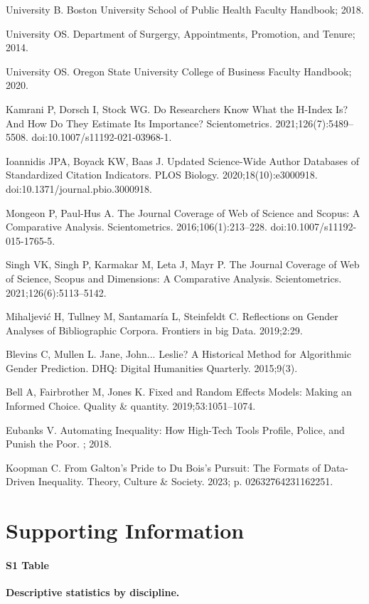 \documentclass[
  10pt,
  letterpaper,
]{article}
\begin{document}
\begin{thebibliography}{10}
University B.
\newblock Boston {{University School}} of {{Public Health Faculty Handbook}}; 2018.

University OS.
\newblock Department of {{Surgergy}}, {{Appointments}}, {{Promotion}}, and {{Tenure}}; 2014.

University OS.
\newblock Oregon {{State University College}} of {{Business Faculty Handbook}}; 2020.

Kamrani P, Dorsch I, Stock WG.
\newblock Do Researchers Know What the H-Index Is? {{And}} How Do They Estimate Its Importance?
\newblock Scientometrics. 2021;126(7):5489--5508.
\newblock doi:{10.1007/s11192-021-03968-1}.

Ioannidis JPA, Boyack KW, Baas J.
\newblock Updated Science-Wide Author Databases of Standardized Citation Indicators.
\newblock PLOS Biology. 2020;18(10):e3000918.
\newblock doi:{10.1371/journal.pbio.3000918}.

Mongeon P, {Paul-Hus} A.
\newblock The Journal Coverage of {{Web}} of {{Science}} and {{Scopus}}: A Comparative Analysis.
\newblock Scientometrics. 2016;106(1):213--228.
\newblock doi:{10.1007/s11192-015-1765-5}.

Singh VK, Singh P, Karmakar M, Leta J, Mayr P.
\newblock The Journal Coverage of {{Web}} of {{Science}}, {{Scopus}} and {{Dimensions}}: {{A}} Comparative Analysis.
\newblock Scientometrics. 2021;126(6):5113--5142.

Mihaljevi{\'c} H, Tullney M, Santamar{\'i}a L, Steinfeldt C.
\newblock Reflections on Gender Analyses of Bibliographic Corpora.
\newblock Frontiers in big Data. 2019;2:29.

Blevins C, Mullen L.
\newblock Jane, {{John}}... {{Leslie}}? {{A Historical Method}} for {{Algorithmic Gender Prediction}}.
\newblock DHQ: Digital Humanities Quarterly. 2015;9(3).

Bell A, Fairbrother M, Jones K.
\newblock Fixed and Random Effects Models: Making an Informed Choice.
\newblock Quality \& quantity. 2019;53:1051--1074.

Eubanks V.
\newblock Automating Inequality: {{How}} High-Tech Tools Profile, Police, and Punish the Poor.
; 2018.

Koopman C.
\newblock From {{Galton}}'s {{Pride}} to {{Du Bois}}'s {{Pursuit}}: {{The Formats}} of {{Data-Driven Inequality}}.
\newblock Theory, Culture \& Society. 2023; p. 02632764231162251.

\end{thebibliography}


\section{Supporting Information}\label{supporting-information}

\paragraph*{S1 Table}
\label{id}
{\textbf{Descriptive statistics by discipline.}}


\nolinenumbers
\end{document}
